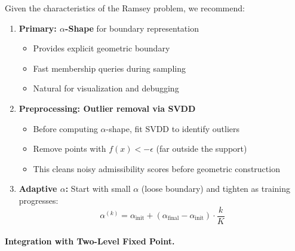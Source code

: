 Given the characteristics of the Ramsey problem, we recommend:

\begin{enumerate}
    \item \textbf{Primary: $\alpha$-Shape} for boundary representation
    \begin{itemize}
        \item Provides explicit geometric boundary
        \item Fast membership queries during sampling
        \item Natural for visualization and debugging
    \end{itemize}
    
    \item \textbf{Preprocessing: Outlier removal via SVDD}
    \begin{itemize}
        \item Before computing $\alpha$-shape, fit SVDD to identify outliers
        \item Remove points with $f(x) < -\epsilon$ (far outside the support)
        \item This cleans noisy admissibility scores before geometric construction
    \end{itemize}
    
    \item \textbf{Adaptive $\alpha$:} Start with small $\alpha$ (loose boundary) and tighten as training progresses:
    \begin{equation}
        \alpha^{(k)} = \alpha_{\text{init}} + (\alpha_{\text{final}} - \alpha_{\text{init}}) \cdot \frac{k}{K}
    \end{equation}
\end{enumerate}

\paragraph{Integration with Two-Level Fixed Point.}

